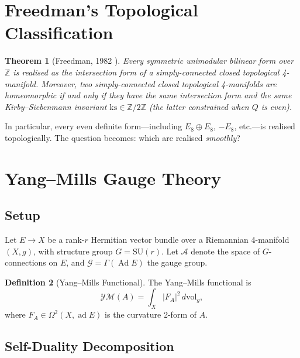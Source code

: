 \documentclass[12pt,a4paper]{amsart}
\newtheorem{theorem}{Theorem}[section]
\theoremstyle{definition}
\newtheorem{definition}[theorem]{Definition}
\theoremstyle{remark}
\DeclareMathOperator{\Ad}{Ad}
\DeclareMathOperator{\ad}{ad}
\newcommand{\ZZ}{\mathbb{Z}}
\begin{document}
\section{Freedman's Topological Classification}

\begin{theorem}[Freedman, 1982 \cite{Freedman1982}]
Every symmetric unimodular bilinear form over $\ZZ$ is realised as the
intersection form of a simply-connected closed topological 4-manifold.
Moreover, two simply-connected closed topological 4-manifolds are
homeomorphic if and only if they have the same intersection form and the
same Kirby--Siebenmann invariant $\mathrm{ks} \in \ZZ/2\ZZ$ (the latter
constrained when $Q$ is even).
\end{theorem}

In particular, every even definite form---including $E_8 \oplus E_8$,
$-E_8$, etc.---is realised topologically.  The question becomes: which are
realised \emph{smoothly}?

\section{Yang--Mills Gauge Theory}

\subsection{Setup}

Let $E \to X$ be a rank-$r$ Hermitian vector bundle over a Riemannian
4-manifold $(X,g)$, with structure group $G = \mathrm{SU}(r)$.  Let
$\mathcal{A}$ denote the space of $G$-connections on $E$, and
$\mathcal{G} = \Gamma(\Ad E)$ the gauge group.

\begin{definition}[Yang--Mills Functional]
The Yang--Mills functional is
\[
  \mathcal{YM}(A) = \int_X |F_A|^2\,d\mathrm{vol}_g,
\]
where $F_A \in \Omega^2(X, \ad E)$ is the curvature 2-form of $A$.
\end{definition}

\subsection{Self-Duality Decomposition}
\end{document}
